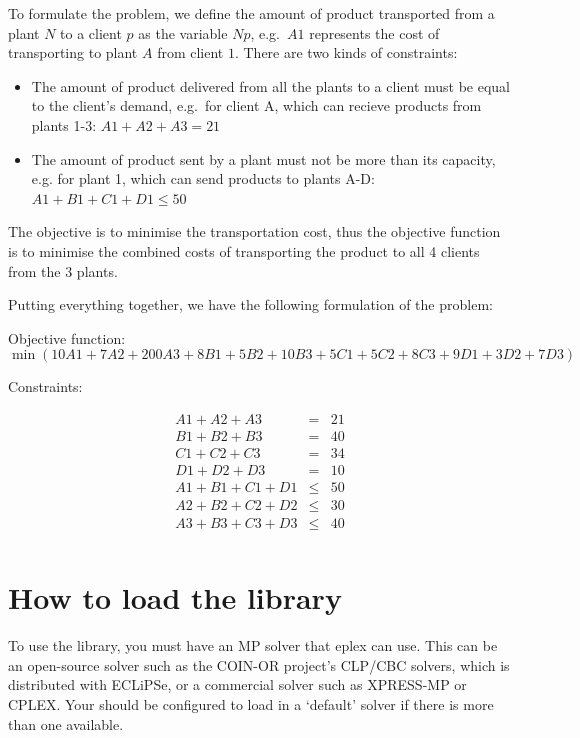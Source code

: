 To formulate the problem, we define the amount of product transported from
a plant $N$ to a client $p$ as the variable $Np$, e.g.\ $A1$
represents the cost of transporting to plant $A$ from client $1$. There are
two kinds of constraints:

\begin{itemize}
\item The amount of product delivered from all the plants to a client must be equal to the
client's demand, e.g.\ for client A, which can recieve products from plants
1-3: \( A1 + A2 + A3 = 21 \)


\item The amount of product sent by a plant must not be more than its
capacity, e.g. for plant 1, which can send products to plants A-D:
\(A1 + B1 + C1 + D1 \leq 50 \)

\end{itemize}

The objective is to minimise the transportation cost, thus the objective
function is to minimise the combined costs of transporting the product to
all 4 clients from the 3 plants.


Putting everything
together, we have the following formulation of the problem:

Objective function:
{\small
\[
\min (10A1 + 7A2 + 200A3 + 8B1 + 5B2 + 10B3 + 5C1 + 5C2 + 8C3 + 9D1 + 3D2 + 7D3) 
\]
}

Constraints:

\begin{eqnarray*}
A1 + A2 + A3 & = & 21\\
B1 + B2 + B3 & = & 40\\
C1 + C2 + C3 & = & 34\\
D1 + D2 + D3 & = & 10\\
A1 + B1 + C1 + D1 & \leq & 50\\
A2 + B2 + C2 + D2 & \leq & 30\\
A3 + B3 + C3 + D3 & \leq & 40\\
\end{eqnarray*}

\section{How to load the library}

To use the library, you must have an MP solver that eplex can use. This
can be an open-source solver such as the COIN-OR project's CLP/CBC solvers,
which is distributed with ECLiPSe, or a commercial solver such as 
XPRESS-MP or CPLEX. Your {\eclipse} should be configured to load in a
`default' solver if there is more than one available. 

